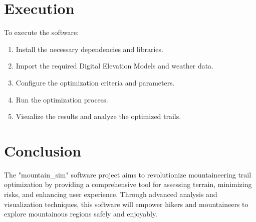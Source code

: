 \documentclass{article}
\begin{document}
\section{Execution}
To execute the software:
\begin{enumerate}
    \item Install the necessary dependencies and libraries.
    \item Import the required Digital Elevation Models and weather data.
    \item Configure the optimization criteria and parameters.
    \item Run the optimization process.
    \item Visualize the results and analyze the optimized trails.
\end{enumerate}

\section{Conclusion}
The "mountain\_sim" software project aims to revolutionize mountaineering trail optimization by providing a comprehensive tool for assessing terrain, minimizing risks, and enhancing user experience. Through advanced analysis and visualization techniques, this software will empower hikers and mountaineers to explore mountainous regions safely and enjoyably.
\end{document}
